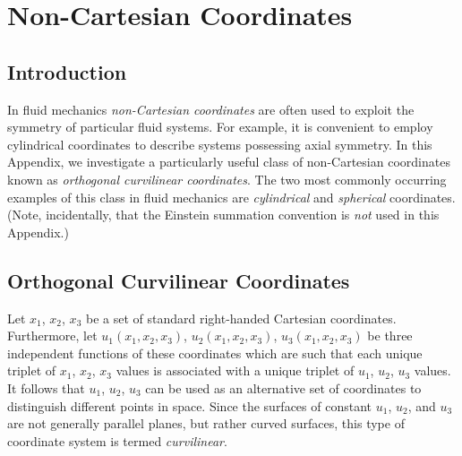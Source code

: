 \chapter{Non-Cartesian Coordinates}\label{ccurv}
\section{Introduction}
In fluid mechanics {\em non-Cartesian coordinates}\/ are often used to exploit the symmetry of particular 
fluid systems. For example, it is convenient  to employ cylindrical coordinates to describe systems possessing
axial symmetry. In this Appendix, we  investigate  a particularly useful class of
non-Cartesian coordinates known as {\em orthogonal curvilinear coordinates}. The two most commonly occurring  examples of this class  in fluid mechanics are {\em cylindrical}\/ 
and {\em spherical}\/ coordinates. (Note, incidentally, that the Einstein summation convention is {\em not}\/ used in this Appendix.)

\section{Orthogonal Curvilinear Coordinates}
Let $x_1$, $x_2$, $x_3$ be a set of standard right-handed Cartesian coordinates. Furthermore, let $u_1(x_1, x_2, x_3)$, 
$u_2(x_1, x_2, x_3)$, $u_3(x_1, x_2, x_3)$ be three independent functions of these coordinates which are
such that each unique triplet of $x_1$, $x_2$, $x_3$ values is associated with a unique triplet of
$u_1$, $u_2$, $u_3$ values. It follows that $u_1$, $u_2$, $u_3$ can be used as an alternative set of coordinates  to
distinguish different points in space. Since the surfaces of constant $u_1$, $u_2$, and $u_3$ are not
generally parallel planes, but rather curved surfaces, this type of coordinate system is termed {\em curvilinear}. 

